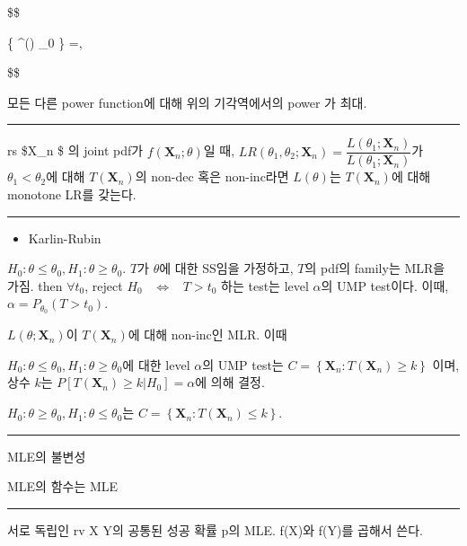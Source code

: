 \documentclass[
]{book}
\providecommand{\tightlist}{%
  \setlength{\itemsep}{0pt}\setlength{\parskip}{0pt}}
\begin{document}
\$\$

\max \{ \pi\^{}\ast (\theta) \vert \theta \in \Omega\_0 \} =\alpha,

\$\$

모든 다른 power function에 대해 위의 기각역에서의 power 가 최대.

\begin{center}\rule{0.5\linewidth}{0.5pt}\end{center}

rs \$\pmb X\_n \$ 의 joint pdf가 \(f(\pmb X_n ; \theta)\)일 때, \(LR( \theta_1 ,\theta_2 ; \pmb X_n) = \dfrac{L(\theta_1 ; \pmb X_n)}{L(\theta_1 ; \pmb X_n)}\)가 \(\theta_1 < \theta_2\)에 대해 \(T(\pmb X_n)\)의 non-dec 혹은 non-inc라면 \(L(\theta)\)는 \(T(\pmb X_n)\)에 대해 monotone LR를 갖는다.

\begin{center}\rule{0.5\linewidth}{0.5pt}\end{center}

\begin{itemize}
\tightlist
\item
  Karlin-Rubin
\end{itemize}

\(H_0: \theta \le \theta_0, H_1: \theta \ge \theta_0\). \(T\)가 \(\theta\)에 대한 SS임을 가정하고, \(T\)의 pdf의 family는 MLR을 가짐. then \(\forall t_0\), reject \(H_0 \; \; \; \iff \; \; \; T>t_0\) 하는 test는 level \(\alpha\)의 UMP test이다. 이때, \(\alpha = P_{\theta_0} (T>t_0)\).

\(L(\theta ; \pmb X_n)\)이 \(T(\pmb X_n)\)에 대해 non-inc인 MLR. 이때

\(H_0: \theta \le \theta_0, H_1: \theta \ge \theta_0\)에 대한 level \(\alpha\)의 UMP test는 \(C = \left\{ \pmb X_n : T(\pmb X_n) \ge k \right\}\) 이며, 상수 \(k\)는 \(P[T(\pmb X_n) \ge k \vert H_0 ] = \alpha\)에 의해 결정.

\(H_0: \theta \ge \theta_0, H_1: \theta \le \theta_0\)는 \(C = \left\{ \pmb X_n : T(\pmb X_n) \le k \right\}\).

\begin{center}\rule{0.5\linewidth}{0.5pt}\end{center}

MLE의 불변성

MLE의 함수는 MLE

\begin{center}\rule{0.5\linewidth}{0.5pt}\end{center}

서로 독립인 rv X Y의 공통된 성공 확률 p의 MLE. f(X)와 f(Y)를 곱해서 쓴다.
\end{document}

